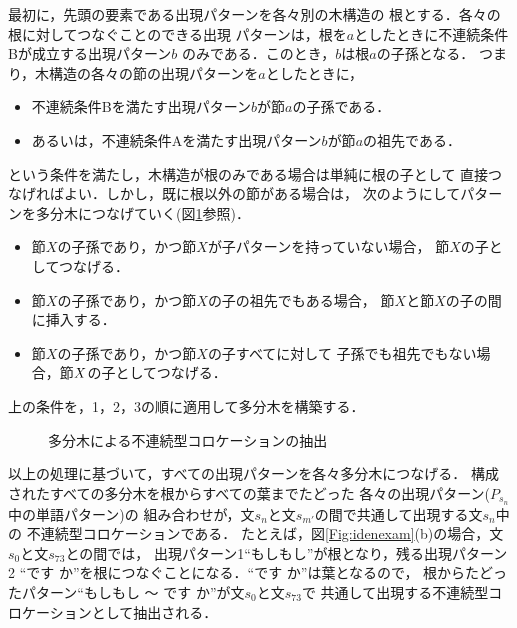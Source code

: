 最初に，先頭の要素である出現パターンを各々別の木構造の
根とする．各々の根に対してつなぐことのできる出現
パターンは，根を$a$としたときに不連続条件Bが成立する出現パターン$b$
のみである．このとき，$b$は根$a$の子孫となる．
つまり，木構造の各々の節の出現パターンを$a$としたときに，
\begin{itemize}
\item 不連続条件Bを満たす出現パターン$b$が節$a$の子孫である．
\item あるいは，不連続条件Aを満たす出現パターン$b$が節$a$の祖先である．
\end{itemize}
という条件を満たし，木構造が根のみである場合は単純に根の子として
直接つなげればよい．しかし，既に根以外の節がある場合は，
次のようにしてパターンを多分木につなげていく(図\ref{Fig:ctree}参照)．
\begin{itemize}
\item[1.] 節$X$の子孫であり，かつ節$X$が子パターンを持っていない場合，
節$X$の子としてつなげる．
\item[2.] 節$X$\hspace{-0.1mm}の子孫であり，かつ節$X$\hspace{-0.1mm}の子の祖先でもある場合，
節$X$\hspace{-0.1mm}と節$X$\hspace{-0.1mm}の子の間に挿入する．
\item[3.] 節$X$\hspace{-0.1mm}の子孫であり，かつ節$X$\hspace{-0.1mm}の子すべてに対して
子孫でも祖先でもない場合，節$X\hspace{-0.1mm}$の子としてつなげる．
\end{itemize}
上の条件を，1，2，3の順に適用して多分木を構築する．
\begin{figure}[hbt]
\begin{center}
\end{center}
\caption{多分木による不連続型コロケーションの抽出}
\label{Fig:ctree}
\vspace{4mm}
\end{figure}

以上の処理に基づいて，すべての出現パターンを各々多分木につなげる．
構成されたすべての多分木を根からすべての葉までたどった
各々の出現パターン($P_{s_n}$中の単語パターン)の
組み合わせが，文\hspace{-0.1mm}$s_n$\hspace{-0.1mm}と文$s_{m'}$の間で共通して出現する文\hspace{-0.1mm}$s_n$\hspace{-0.1mm}中の
不連続型コロケーションである．
たとえば，図\ref{Fig:idenexam}(b)の場合，文$s_0$と文$s_{73}$との間では，
出現パターン1``もしもし''が根となり，残る出現パターン2
``です か''を根につなぐことになる．``です か''は葉となるので，
根からたどったパターン``もしもし 〜 です か''が文$s_0$と文$s_{73}$で
共通して出現する不連続型コロケーションとして抽出される．

